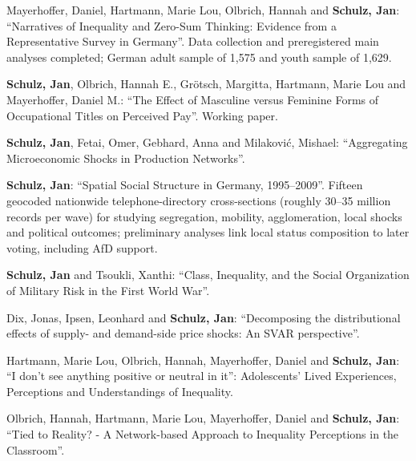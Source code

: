 \documentclass[margin]{res}
\begin{document}
\begin{resume}
	Mayerhoffer, Daniel, Hartmann, Marie Lou, Olbrich, Hannah and \textbf{Schulz, Jan}: ``Narratives of Inequality and Zero-Sum Thinking: Evidence from a Representative Survey in Germany''. Data collection and preregistered main analyses completed; German adult sample of 1,575 and youth sample of 1,629.
	
	\textbf{Schulz, Jan}, Olbrich, Hannah E., Gr\"otsch, Margitta, Hartmann, Marie Lou and Mayerhoffer, Daniel M.: ``The Effect of Masculine versus Feminine Forms of Occupational Titles on Perceived Pay''. Working paper.
	
	\textbf{Schulz, Jan}, Fetai, Omer,	Gebhard, Anna and Milakovi\'c, Mishael: ``Aggregating Microeconomic Shocks in Production Networks''.
	
	\textbf{Schulz, Jan}: ``Spatial Social Structure in Germany, 1995--2009''. Fifteen geocoded nationwide telephone-directory cross-sections (roughly 30--35 million records per wave) for studying segregation, mobility, agglomeration, local shocks and political outcomes; preliminary analyses link local status composition to later voting, including AfD support.
	
	\textbf{Schulz, Jan} and Tsoukli, Xanthi: ``Class, Inequality, and the Social Organization of Military Risk in the First World War''.
	
	
	Dix, Jonas, Ipsen, Leonhard and \textbf{Schulz, Jan}: ``Decomposing the distributional effects of supply- and demand-side price shocks: An SVAR perspective''.
	
	Hartmann, Marie Lou, Olbrich, Hannah, Mayerhoffer, Daniel and \textbf{Schulz, Jan}: ``I don't see anything positive or neutral in it'': Adolescents' Lived Experiences, Perceptions and Understandings of Inequality.
	
	Olbrich, Hannah, Hartmann, Marie Lou, Mayerhoffer, Daniel  and \textbf{Schulz, Jan}:  ``Tied to Reality? - A Network-based Approach to Inequality Perceptions in the Classroom''.
	
	
	

\end{resume}
\end{document}
